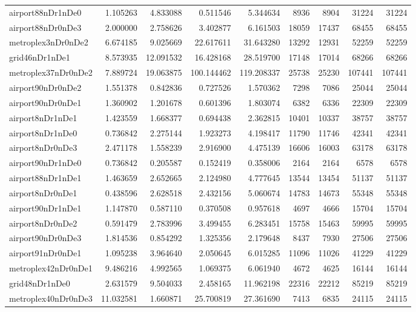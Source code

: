 \begin{longtable}{|l|r|r|r|r|r|r|r|r|}
airport88nDr1nDe0 & 1.105263 & 4.833088 & 0.511546 & 5.344634 & 8936 & 8904 & 31224 & 31224 \\
airport88nDr0nDe3 & 2.000000 & 2.758626 & 3.402877 & 6.161503 & 18059 & 17437 & 68455 & 68455 \\
metroplex3nDr0nDe2 & 6.674185 & 9.025669 & 22.617611 & 31.643280 & 13292 & 12931 & 52259 & 52259 \\
grid46nDr1nDe1 & 8.573935 & 12.091532 & 16.428168 & 28.519700 & 17148 & 17014 & 68266 & 68266 \\
metroplex37nDr0nDe2 & 7.889724 & 19.063875 & 100.144462 & 119.208337 & 25738 & 25230 & 107441 & 107441 \\
airport90nDr0nDe2 & 1.551378 & 0.842836 & 0.727526 & 1.570362 & 7298 & 7086 & 25044 & 25044 \\
airport90nDr0nDe1 & 1.360902 & 1.201678 & 0.601396 & 1.803074 & 6382 & 6336 & 22309 & 22309 \\
airport8nDr1nDe1 & 1.423559 & 1.668377 & 0.694438 & 2.362815 & 10401 & 10337 & 38757 & 38757 \\
airport8nDr1nDe0 & 0.736842 & 2.275144 & 1.923273 & 4.198417 & 11790 & 11746 & 42341 & 42341 \\
airport8nDr0nDe3 & 2.471178 & 1.558239 & 2.916900 & 4.475139 & 16606 & 16003 & 63178 & 63178 \\
airport90nDr1nDe0 & 0.736842 & 0.205587 & 0.152419 & 0.358006 & 2164 & 2164 & 6578 & 6578 \\
airport88nDr1nDe1 & 1.463659 & 2.652665 & 2.124980 & 4.777645 & 13544 & 13454 & 51137 & 51137 \\
airport8nDr0nDe1 & 0.438596 & 2.628518 & 2.432156 & 5.060674 & 14783 & 14673 & 55348 & 55348 \\
airport90nDr1nDe1 & 1.147870 & 0.587110 & 0.370508 & 0.957618 & 4697 & 4666 & 15704 & 15704 \\
airport8nDr0nDe2 & 0.591479 & 2.783996 & 3.499455 & 6.283451 & 15758 & 15463 & 59995 & 59995 \\
airport90nDr0nDe3 & 1.814536 & 0.854292 & 1.325356 & 2.179648 & 8437 & 7930 & 27506 & 27506 \\
airport91nDr0nDe1 & 1.095238 & 3.964640 & 2.050645 & 6.015285 & 11096 & 11026 & 41229 & 41229 \\
metroplex42nDr0nDe1 & 9.486216 & 4.992565 & 1.069375 & 6.061940 & 4672 & 4625 & 16144 & 16144 \\
grid48nDr1nDe0 & 2.631579 & 9.504033 & 2.458165 & 11.962198 & 22316 & 22212 & 85219 & 85219 \\
metroplex40nDr0nDe3 & 11.032581 & 1.660871 & 25.700819 & 27.361690 & 7413 & 6835 & 24115 & 24115 \\

\end{longtable}
